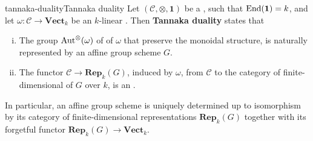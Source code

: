 \begin{topic}{tannaka-duality}{Tannaka duality}
    Let $(\mathcal{C}, \otimes, \textbf{1})$ be a   , such that $\textup{End}(\textbf{1}) = k$, and let $\omega : \mathcal{C} \to \textbf{Vect}_k$ be an   $k$-linear  . Then \textbf{Tannaka duality} states that
    \begin{enumerate}[(i)]
        \item The group $\textup{Aut}^\otimes(\omega)$ of  of $\omega$ that preserve the monoidal structure, is naturally represented by an affine group scheme $G$.
        \item The functor $\mathcal{C} \to \textbf{Rep}_k(G)$, induced by $\omega$, from $\mathcal{C}$ to the category of finite-dimensional  of $G$ over $k$, is an .
    \end{enumerate}
    In particular, an affine group scheme is uniquely determined up to isomorphism by its category of finite-dimensional representations $\textbf{Rep}_k(G)$ together with its forgetful functor $\textbf{Rep}_k(G) \to \textbf{Vect}_k$.
\end{topic}

